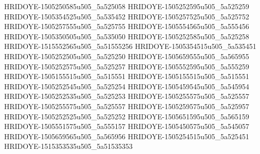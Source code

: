 HRIDOYE-1505250585u505_5a525058
HRIDOYE-1505252595u505_5a525259
HRIDOYE-1505354525u505_5a535452
HRIDOYE-1505257525u505_5a525752
HRIDOYE-1505257555u505_5a525755
HRIDOYE-1505554565u505_5a555456
HRIDOYE-1505350505u505_5a535050
HRIDOYE-1505252585u505_5a525258
HRIDOYE-1515552565u505_5a51555256
HRIDOYE-1505354515u505_5a535451
HRIDOYE-1505252505u505_5a525250
HRIDOYE-1505659555u505_5a565955
HRIDOYE-1505252575u505_5a525257
HRIDOYE-1505552595u505_5a555259
HRIDOYE-1505155515u505_5a515551
HRIDOYE-1505155515u505_5a515551
HRIDOYE-1505252545u505_5a525254
HRIDOYE-1505459545u505_5a545954
HRIDOYE-1505252535u505_5a525253
HRIDOYE-1505255575u505_5a525557
HRIDOYE-1505255575u505_5a525557
HRIDOYE-1505259575u505_5a525957
HRIDOYE-1505252525u505_5a525252
HRIDOYE-1505651595u505_5a565159
HRIDOYE-1505551575u505_5a555157
HRIDOYE-1505450575u505_5a545057
HRIDOYE-1505659565u505_5a565956
HRIDOYE-1505254515u505_5a525451
HRIDOYE-1515353535u505_5a51535353
